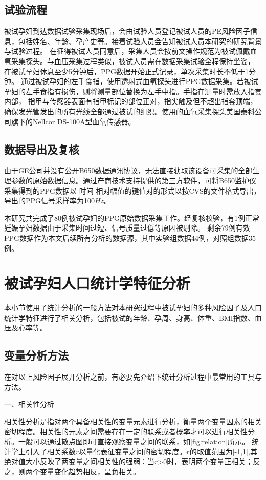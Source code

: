 \subsection{试验流程}
被试孕妇到达数据试验采集现场后，会由试验人员登记被试人员的PE风险因子信息，包括姓名、年龄、孕产史等。接着试验人员会告知被试人员本研究的研究背景与试验过程。
在征得被试人员同意后，采集人员会按前文操作规范为被试佩戴血氧采集探头\cite{Chen2021}。与血压采集过程类似\cite{FIGO}，被试人员需在数据采集试验全程保持坐姿，
在被试孕妇休息至少5分钟后，PPG数据开始正式记录，单次采集时长不低于1分钟。
通过被试孕妇的左手食指，使用透射式血氧探头进行PPG数据采集。若被试孕妇的左手食指有损伤，则将测量部位替换为左手中指。手指在测量时需放入指套内部，
指甲与传感器表面有指甲标记的部位正对，指尖触及但不超出指套顶端，确保发光管发出的所有光线全部通过被试的组织。使用的血氧采集探头美国泰科公司旗下的Nellcor DS-100A型血氧传感器。 

\subsection{数据导出及复核}
由于GE公司并没有公开B650数据通讯协议，无法直接获取该设备可采集的全部生理参数的原始数据信息。通过产商技术支持提供的第三方软件，可将B650监护仪采集得到的PPG数据以
时间-相对幅值的键值对的形式以按CVS的文件格式导出，导出的PPG信号采样率为100$Hz$。

本研究共完成了80例被试孕妇的PPG原始数据采集工作。经复核校验，有1例正常妊娠孕妇数据由于采集时间过短、信号质量过低等原因被剔除。
剩余79例有效PPG数据作为本文后续所有分析的数据源，其中实验组数据44例，对照组数据35例。
\section{被试孕妇人口统计学特征分析}
本小节使用了统计分析的一般方法对本研究过程中被试孕妇的多种风险因子及人口统计学特征进行了相关分析，包括被试的年龄、孕周、身高、体重、BMI指数、血压及心率等。
\subsection{变量分析方法}
在对以上风险因子展开分析之前，有必要先介绍下统计分析过程中最常用的工具与方法。

一、相关性分析

相关性分析是指对两个具备相关性的变量元素进行分析，衡量两个变量因素的相关密切程度\cite{Zhang2019}。相关性的元素之间需要存在一定的联系或者概率才可以进行相关性分析。一般可以通过散点图即可直接观察变量之间的联系，如\autoref{fig:relation}所示。
统计学上引入了相关系数$r$以量化表征变量之间的密切程度。$r$的取值范围为[-1,1],其绝对值大小反映了两变量之间相关性的强弱：当$r$>0时，表明两个变量正相关；反之，则两个变量变化趋势相反，呈负相关。

